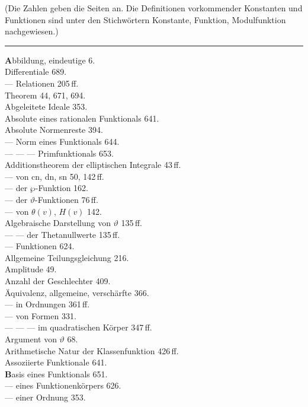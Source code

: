 
\begin{center}
\end{center}

\noindent(Die Zahlen geben die Seiten an. Die Definitionen vorkommender Konstanten und Funktionen sind unter den Stichwörtern Konstante, Funktion, Modulfunktion nachgewiesen.)

\begin{center}
\rule{2cm}{0.4pt}
\end{center}

\noindent
\begin{minipage}[t]{0.48\textwidth}
\noindent
\textbf{A}bbildung, eindeutige 6. \\
 Differentiale 689. \\
--- Relationen 205\,ff. \\
 Theorem 44, 671, 694. \\
Abgeleitete Ideale 353. \\
Absolute eines rationalen Funktionals 641. \\
Absolute Normenreste 394. \\
--- Norm eines Funktionals 644. \\
--- --- --- Primfunktionals 653. \\
Additionstheorem der elliptischen Integrale 43\,ff. \\
--- von cn, dn, sn 50, 142\,ff. \\
--- der $\wp$-Funktion 162. \\
--- der $\vartheta$-Funktionen 76\,ff. \\
--- von $\theta(v)$, $H(v)$ 142. \\
Algebraische Darstellung von $\vartheta$ 135\,ff. \\
--- --- der Thetanullwerte 135\,ff. \\
--- Funktionen 624. \\
Allgemeine Teilungsgleichung 216. \\
Amplitude 49. \\
Anzahl der Geschlechter 409. \\
Äquivalenz, allgemeine, verschärfte 366. \\
--- in Ordnungen 361\,ff. \\
--- von Formen 331. \\
--- --- --- im quadratischen Körper 347\,ff. \\
Argument von $\vartheta$ 68. \\
Arithmetische Natur der Klassenfunktion 426\,ff. \\
Assoziierte Funktionale 641. \\[4pt]
\textbf{B}asis eines Funktionals 651. \\
--- eines Funktionenkörpers 626. \\
--- einer Ordnung 353.
\end{minipage}%
